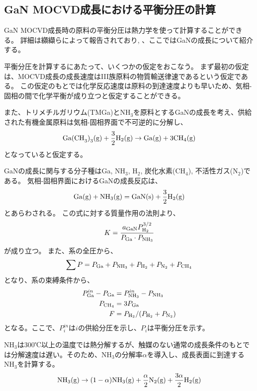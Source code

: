 \subsection{GaN MOCVD成長における平衡分圧の計算}
GaN MOCVD成長時の原料の平衡分圧は熱力学を使って計算することができる。
詳細は纐纈らによって報告されており\cite{movpe_gan}, \cite{movpe_gan_jap}、ここではGaNの成長について紹介する。

平衡分圧を計算するにあたって、いくつかの仮定をおこなう。
まず最初の仮定は、MOCVD成長の成長速度はIII族原料の物質輸送律速であるという仮定である。
この仮定のもとでは化学反応速度は原料の到達速度よりも早いため、気相-固相の間で化学平衡が成り立つと仮定することができる。

また、トリメチルガリウム(TMGa)とNH$_{3}$を原料とするGaNの成長を考え、供給された有機金属原料は気相-固相界面で不可逆的に分解し、
\begin{equation}
  \rm{Ga(CH}_{3}\rm{)}_{3}(\rm{g}) + \frac{3}{2}\rm{H}_{2}(\rm{g}) \rightarrow \rm{Ga}(\rm{g}) + 3\rm{CH}_{4}(\rm{g})
\end{equation}
となっていると仮定する。

GaNの成長に関与する分子種はGa, NH$_{3}$, H$_{2}$, 炭化水素(CH$_{4}$), 不活性ガス(N$_{2}$)である。
気相-固相界面におけるGaNの成長反応は、
\begin{equation}
  \rm{Ga}(\rm{g}) + \rm{NH}_{3}(\rm{g}) = \rm{GaN}(\rm{s}) + \frac{3}{2}\rm{H}_{2}(\rm{g})
\end{equation}
とあらわされる。
この式に対する質量作用の法則より、
\begin{equation}
  K = \frac{a_{\rm{GaN}}P_{\rm{H}_{2}}^{3/2}}{P_{\rm{Ga}}\cdot P_{\rm{NH}_{3}}}
\end{equation}
が成り立つ。
また、系の全圧から、
\begin{equation}
  \sum P = P_{\rm{Ga}}+P_{\rm{NH}_{3}} + P_{\rm{H}_{2}} + P_{\rm{N}_{2}} + P_{\rm{CH}_{4}}
\end{equation}
となり、系の束縛条件から、
\begin{align}
  P_{\rm{Ga}}^{in}- P_{\rm{Ga}} &= P_{\rm{NH}_{3}}^{in} - P_{\rm{NH}_{3}} \\
  P_{\rm{CH}_{4}} &= 3 P_{\rm{Ga}} \\
  F &= P_{\rm{H}_{2}} / (P_{\rm{H}_{2}} + P_{\rm{N}_{2}})
\end{align}
となる。ここで、$P_{i}^{in}$は$i$の供給分圧を示し、$P_{i}$は平衡分圧を示す。

NH$_{3}$は300℃以上の温度では熱分解するが、触媒のない通常の成長条件のもとでは分解速度は遅い。そのため、NH$_{3}$の分解率$\alpha$を導入し、成長表面に到達するNH$_{3}$を計算する。
\begin{equation}
  \rm{NH}_{3}(\rm{g}) \rightarrow (1-\alpha ) \rm{NH}_{3}(\rm{g}) + \frac{\alpha}{2} \rm{N}_{2}(\rm{g}) + \frac{3\alpha}{2} \rm{H}_{2}(\rm{g})
\end{equation}


